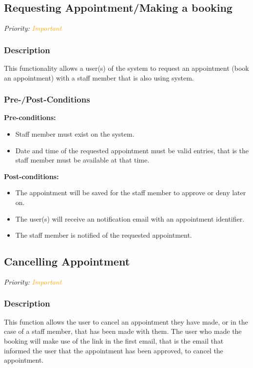 \subsection{Requesting Appointment/Making a booking}
\textit{Priority: \textcolor{orange}{Important}} 

\subsubsection{Description}

This functionality allows a user(s) of the system to request an appointment (book an appointment) with a staff member that is also using system. 


\subsubsection{Pre-/Post-Conditions}
\textbf{Pre-conditions:} 
	\begin{itemize}
		\item Staff member must exist on the system.
		\item Date and time of the requested appointment must be valid entries, that is the staff member must be available at that time.
	\end{itemize}
\textbf{Post-conditions:} 
	\begin{itemize}
		\item The appointment will be saved for the staff member to approve or deny later on.
		\item The user(s) will receive an notification email with an appointment identifier.
		\item The staff member is notified of the requested appointment. 
	\end{itemize}

\subsection{Cancelling Appointment}
\textit{Priority: \textcolor{orange}{Important}} 

\subsubsection{Description}
This function allows the user to cancel an appointment they have made, or in the case of a staff member, that has been made with them. The user who made the booking will make use of the link in the first email, that is the email that informed the user that the appointment has been approved, to cancel the appointment. 


